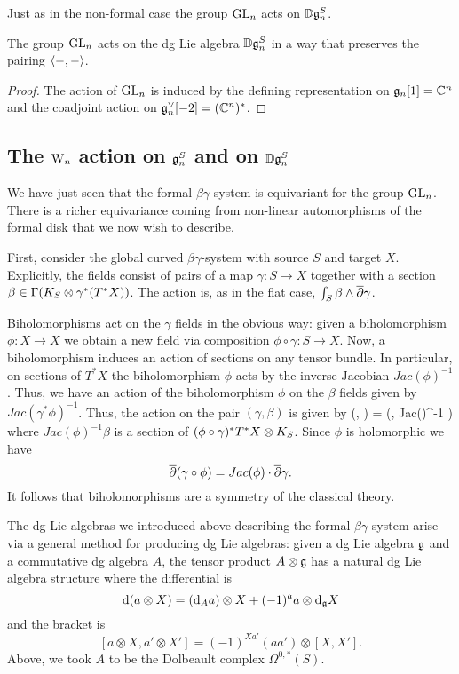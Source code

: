 Just as in the non-formal case the group ${\rm GL}_n$ acts on $\mathbb D
\mathfrak g_n^S$. 

\begin{lemma}\label{GLaction} The group ${\rm GL}_n$ acts on the dg Lie algebra $\mathbb D
  \mathfrak g_n^S$ in a way that preserves the pairing $\left\langle-,-\right\rangle$. 
\end{lemma}
\begin{proof} 
The action of ${\rm GL}_n$ is induced by the defining representation on
$\mathfrak g_n [1] = \mathbb C^n$ and the coadjoint action on $\mathfrak g_n^\vee [-2] =
(\mathbb C^n)^*$. 
\end{proof}

\subsection{The ${{\rm W}_n}$ action on $\mathfrak{g}_n^S$ and on $\mathbb D\mathfrak{g}_n^S$}\label{classicalvectaction}

We have just seen that the formal $\beta\gamma$ system is equivariant
for the group ${\rm GL}_n$. There is a richer equivariance coming from
non-linear automorphisms of the formal disk that we now wish to
describe. 

First, consider the global curved $\beta \gamma$-system with source
$S$ and target $X$. Explicitly, the fields consist of pairs of a map $\gamma : S
\to X$ together with a section $\beta \in \Gamma(K_S \otimes
\gamma^*(T^*X))$. The action is, as in the flat case, $\int_S \beta
\wedge \overline{\partial} \gamma$. 

Biholomorphisms act on the $\gamma$ fields in the
obvious way: given a biholomorphism $\phi : X \to X$ we obtain a new
field via composition $\phi \circ \gamma : S \to
X$. Now, a biholomorphism induces an action of sections on any tensor
bundle. In particular, on sections of $T^*X$ the biholomorphism $\phi$
acts by the inverse Jacobian $Jac(\phi)^{-1}$. Thus, we have an action
of the biholomorphism $\phi$ on the $\beta$ fields given by
$Jac(\gamma^*\phi)^{-1}$. Thus, the action on the pair $(\gamma,
\beta)$ is given by
\ben
\phi \cdot (\gamma, \beta) = (\phi \circ \gamma, Jac(\phi)^{-1} \beta) 
\een
where $Jac(\phi)^{-1} \beta$ is a section of $(\phi \circ
\gamma)^*T^*X \otimes K_S$. Since $\phi$ is holomorphic we have $$\overline{\partial}
(\gamma \circ \phi) = Jac(\phi) \cdot \overline{\partial} \gamma .$$ It follows that biholomorphisms
are a symmetry of the classical theory. 

The dg Lie algebras we introduced above describing the formal
$\beta\gamma$ system arise via a general method for producing dg Lie algebras:
given a dg Lie algebra $\mathfrak g$ and a commutative dg algebra $A$, the tensor product $A \otimes \mathfrak g$ has a natural 
dg Lie algebra structure where the differential is
\[
{\rm d}( a \otimes X) = ({\rm d}_A a) \otimes X + (-1)^{a} a \otimes {\rm d}_\mathfrak g X
\]
and the bracket is
\[
[a \otimes X, a' \otimes X'] = (-1)^{Xa'} (aa') \otimes [X,X'].
\]
Above, we took $A$ to be the Dolbeault complex $\Omega^{0,*}(S)$.

